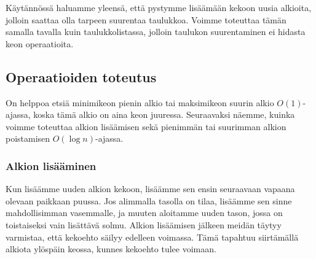 Käytännössä haluamme yleensä,
että pystymme lisäämään kekoon uusia alkioita,
jolloin saattaa olla tarpeen suurentaa taulukkoa.
Voimme toteuttaa tämän samalla tavalla kuin taulukkolistassa,
jolloin taulukon suurentaminen ei hidasta keon operaatioita.

\subsection{Operaatioiden toteutus}

On helppoa etsiä minimikeon pienin alkio
tai maksimikeon suurin alkio $O(1)$-ajassa,
koska tämä alkio on aina keon juuressa.
Seuraavaksi näemme, kuinka voimme toteuttaa alkion lisäämisen
sekä pienimmän tai suurimman alkion poistamisen $O(\log n)$-ajassa.

\subsubsection{Alkion lisääminen}

Kun lisäämme uuden alkion kekoon, lisäämme sen ensin seuraavaan
vapaana olevaan paikkaan puussa. Jos alimmalla tasolla on tilaa,
lisäämme sen sinne mahdollisimman vasemmalle,
ja muuten aloitamme uuden tason, jossa on toistaiseksi vain lisättävä solmu.
Alkion lisäämisen jälkeen meidän täytyy varmistaa,
että kekoehto säilyy edelleen voimassa.
Tämä tapahtuu siirtämällä alkiota ylöspäin keossa,
kunnes kekoehto tulee voimaan.


